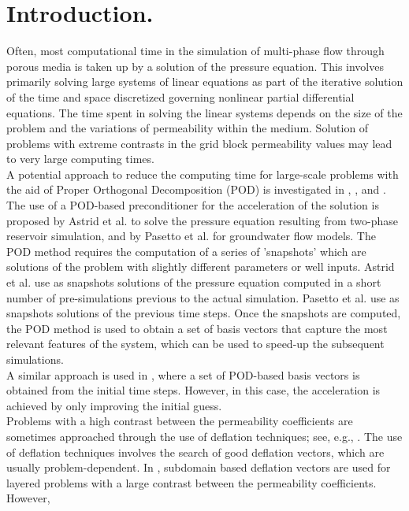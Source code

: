\documentclass[12pt]{article}
\numberwithin{equation}{section}
\begin{document}
  \section{Introduction.}
  \hspace{0.5cm}Often, most computational time in the simulation of multi-phase flow through porous media is taken up by a
solution of the pressure equation. This involves primarily solving large systems of linear equations as 
part of the iterative solution of the time and space discretized governing nonlinear partial differential 
equations. The time spent in solving the linear systems depends on the size of the problem and the 
variations of permeability within the medium. Solution of problems with extreme contrasts in the grid block 
permeability values may lead to very large computing times.\\
A potential approach to reduce the computing time for large-scale problems with the aid of Proper Orthogonal 
Decomposition (POD) is investigated in \cite{Astrid11}, \cite{Mark06}, \cite{Pasetto16} and \cite{Carlberg15}. The use of a POD-based preconditioner for the acceleration of the solution is proposed by Astrid et al. \cite{Astrid11} to solve the pressure equation resulting from two-phase reservoir simulation, and by Pasetto et al. \cite{Pasetto16} for groundwater flow models. 
The POD method requires the computation of a series of 'snapshots' which are solutions of the problem with slightly different parameters or well inputs. Astrid et al. \cite{Astrid11} use as snapshots solutions of the pressure equation computed in a short number of pre-simulations previous to the actual simulation. Pasetto et al. \cite{Pasetto16} use as snapshots solutions of the previous time steps.
Once the snapshots are computed, the POD method is used to obtain a set of basis 
vectors that capture the most relevant features of the system, which can be used to speed-up the subsequent simulations.\\
A similar approach is used in \cite{Mark06}, where a set of POD-based 
basis vectors is obtained from the initial time steps. However, in this case, the acceleration is 
achieved by only improving the initial guess.\\
Problems with a high contrast between the permeability coefficients are sometimes approached through the 
use of deflation techniques; see, e.g., \cite{Vuik99}. The use of deflation techniques involves the search 
of good deflation vectors, which are usually problem-dependent. In \cite{Vuik99}, subdomain based deflation 
vectors are used for layered problems with a large contrast between the permeability coefficients. However, 
\end{document}

